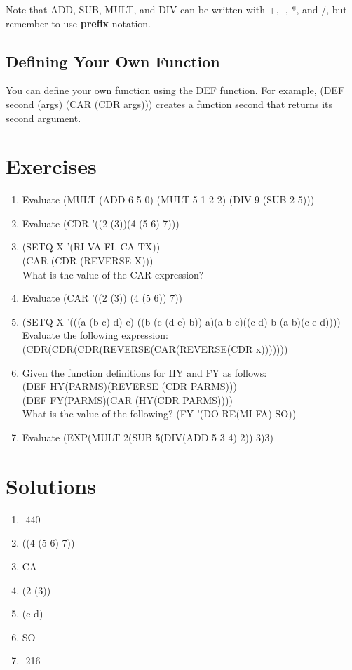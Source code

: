 \documentclass[11pt,letterpaper]{article}
\begin{document}
    Note that ADD, SUB, MULT, and DIV can be written with +, -, *, and /,
    but remember to use \textbf{prefix} notation.

    \subsection{Defining Your Own Function}
    You can define your own function using the DEF function.
    For example, (DEF second (args) (CAR (CDR args))) creates
    a function second that returns its second argument.

    \newpage
    \section{Exercises}
    \begin{enumerate}
        \item Evaluate (MULT (ADD 6 5 0) (MULT 5 1 2 2) (DIV 9 (SUB 2 5)))
        \item Evaluate (CDR '((2 (3))(4 (5 6) 7)))
        \item (SETQ X '(RI VA FL CA TX))\\
        (CAR (CDR (REVERSE X)))\\
        What is the value of the CAR expression?
        \item Evaluate (CAR '((2 (3)) (4 (5 6)) 7))
        \item (SETQ X '(((a (b c) d) e) ((b (c (d e) b)) a)(a b c)((c d) b (a b)(c e d))))\\
        Evaluate the following expression:\\
        (CDR(CDR(CDR(REVERSE(CAR(REVERSE(CDR x)))))))
        \item Given the function definitions for HY and FY as follows:\\
        (DEF HY(PARMS)(REVERSE (CDR PARMS)))\\
        (DEF FY(PARMS)(CAR (HY(CDR PARMS))))\\
        What is the value of the following?
        (FY '(DO RE(MI FA) SO))
        \item Evaluate
        (EXP(MULT 2(SUB 5(DIV(ADD 5 3 4) 2)) 3)3)
    \end{enumerate}

    \newpage
    \section{Solutions}
    \begin{enumerate}
        \item -440
        \item ((4 (5 6) 7))
        \item CA
        \item (2 (3))
        \item (e d)
        \item SO
        \item -216
    \end{enumerate}
\end{document}
